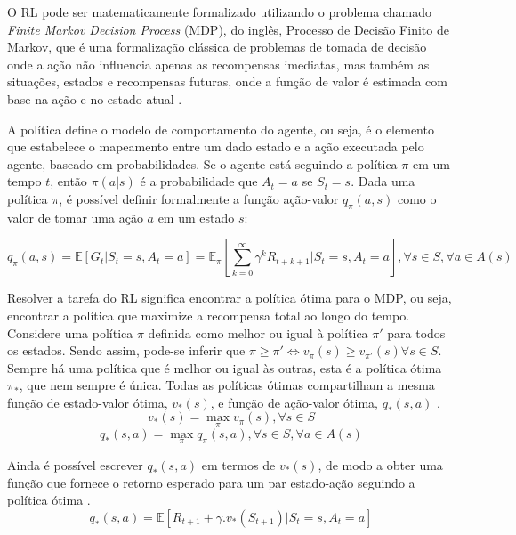 \documentclass[a4paper]{ifacconf}
\begin{document}
O RL pode ser matematicamente formalizado utilizando o problema chamado \emph{Finite Markov Decision Process} (MDP), do inglês, Processo de Decisão Finito de Markov, que é uma formalização clássica de problemas de tomada de decisão onde a ação não influencia apenas as recompensas imediatas, mas também as situações, estados e recompensas futuras, onde a função de valor é estimada com base na ação e no estado atual \cite{ql_model,markov_tut}. 

A política define o modelo de comportamento do agente, ou seja, é o elemento que estabelece o mapeamento entre um dado estado e a ação executada pelo agente, baseado em probabilidades\cite{rl_rob_survey}. Se o agente está seguindo a política $\pi$ em um tempo $t$, então $\pi(a|s)$ é a probabilidade que $A_{t} = a$ se $S_{t} = s$. Dada uma política $\pi$, é possível definir formalmente a função ação-valor $q_{\pi}(a,s)$ como o valor de tomar uma ação $a$ em um estado $s$:

\begin{equation}
q_{\pi}(a,s) = \mathbb{E}[G_{t}|S_{t}=s,A_{t}=a] = \mathbb{E}_{\pi}[\sum_{k=0}^{\infty} \gamma^k R_{t+k+1}|S_{t}=s,A_{t}=a], \forall s \in S, \forall a \in A(s)
\end{equation}

Resolver a tarefa do RL significa encontrar a política ótima para o MDP, ou seja, encontrar a política que maximize a recompensa total ao longo do tempo. Considere uma política $\pi$ definida como melhor ou igual à política $\pi'$ para todos os estados. Sendo assim, pode-se inferir que $\pi \geq \pi' \Leftrightarrow v_{\pi}(s) \geq v_{\pi'}(s) \forall s \in S$. Sempre há uma política que é melhor ou igual às outras, esta é a política ótima $\pi_{*}$, que nem sempre é única. Todas as políticas ótimas compartilham a mesma função de estado-valor ótima, $v_{*}(s)$, e função de ação-valor ótima, $q_{*}(s,a)$ \cite{intro_to_rl}.
\begin{equation}
v_{*}(s) = \max_{\pi} v_{\pi}(s), \forall s \in S
\end{equation}
\begin{equation}
q_{*}(s,a) = \max_{\pi} q_{\pi}(s,a), \forall s \in S,\forall a \in A(s)
\end{equation}

Ainda é possível escrever $q_{*}(s,a)$ em termos de $v_{*}(s)$, de modo a obter uma função que fornece o retorno esperado para um par estado-ação seguindo a política ótima \cite{intro_to_rl}.
\begin{equation}
q_{*}(s,a) = \mathbb{E}[R_{t+1}+ \gamma .v_{*}(S_{t+1})|S_{t}=s,A_{t}=a]
\end{equation}
\end{document}
